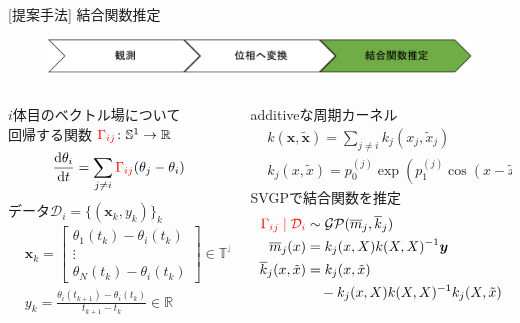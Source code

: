 \begin{frame}[t]{[提案手法] 結合関数推定}
  \begin{figure}
    \centering
    \includegraphics[width=\textwidth]{figs/flowchart3.pdf}
  \end{figure}
  \begin{columns}[t]
    \begin{column}{0.45\textwidth}
      $i$体目のベクトル場について\\
      \checkmark 回帰する関数 $\textcolor{red}{\Gamma_{ij}}\colon\mathbb{S}^{1}\to\mathbb{R}$
      \begin{align*}
        \frac{\mathrm{d}\theta_{i}}{\mathrm{d} t}=\sum_{j\ne i}\textcolor{red}{\Gamma_{ij}}(\theta_{j}-\theta_{i})
      \end{align*}
      \checkmark データ$\mathcal{D}_{i}=\{(\bm{x}_{k},y_{k})\}_{k}$
      \begin{align*}
        &\bm{x}_{k}=\begin{bmatrix}
          \theta_{1}(t_{k}) - \theta_{i}(t_{k})\\
          \vdots\\
          \theta_{N}(t_{k}) - \theta_{i}(t_{k})
        \end{bmatrix} \in \mathbb{T}^{N-1}\\
        &y_{k}=\frac{\theta_{i}(t_{k+1}) - \theta_{i}(t_{k})}{t_{k+1} - t_{k}} \in \mathbb{R}
      \end{align*}
    \end{column}
    \begin{column}{0.55\textwidth}
      \checkmark additiveな周期カーネル
      \begin{align*}
        &k(\bm{x},\tilde{\bm{x}})=\sum_{j\ne i}k_{j}(x_{j},\tilde{x}_{j})\\
        &k_{j}(x,\tilde{x})=p_{0}^{(j)}\exp(p_{1}^{(j)}\cos(x-\tilde{x}))
      \end{align*}
      \checkmark SVGPで結合関数を推定
      \begin{align*}
        \textcolor{red}{\Gamma_{ij}\mid\mathcal{D}_{i}}&\sim\mathcal{GP}(\overline{m}_{j}, \overline{k}_{j})\\
        \overline{m}_{j}(x)&=k_{j}(x,X)k(X,X)^{-1}\bm{y}\\
        \overline{k}_{j}(x,\tilde{x})&=k_{j}(x,\tilde{x})\\
        &\quad -k_{j}(x,X)k(X,X)^{-1}k_{j}(X,\tilde{x})
      \end{align*}
    \end{column}
  \end{columns}
\end{frame}

